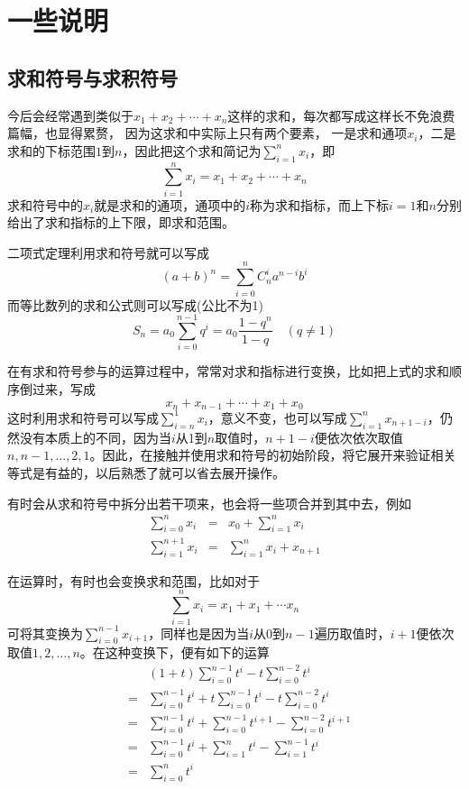 
\section{一些说明}
\label{sec:some-instruction}

\subsection{求和符号与求积符号}
\label{sec:sum-prod-symbol}

今后会经常遇到类似于$x_1+x_2+\cdots+x_n$这样的求和，每次都写成这样长不免浪费篇幅，也显得累赘， 因为这求和中实际上只有两个要素，
一是求和通项$x_i$，二是求和的下标范围$1$到$n$，因此把这个求和简记为$\sum\limits_{i=1}^nx_i$，即
\[ \sum_{i=1}^n x_i = x_1+x_2+\cdots+x_n \]
求和符号中的$x_i$就是求和的通项，通项中的$i$称为求和指标，而上下标$i=1$和$n$分别给出了求和指标的上下限，即求和范围。

\begin{example}
  二项式定理利用求和符号就可以写成
  \[ (a+b)^n = \sum_{i=0}^n C_n^i a^{n-i}b^i \]
  而等比数列的求和公式则可以写成(公比不为1)
  \[ S_n={a_0}\sum_{i=0}^{n-1}q^i = {a_0}\frac{1-q^n}{1-q} \quad (q \neq 1)\]
\end{example}

在有求和符号参与的运算过程中，常常对求和指标进行变换，比如把上式的求和顺序倒过来，写成
\[ x_n+x_{n-1}+\cdots+x_1+x_0 \]
这时利用求和符号可以写成$\sum\limits_{i=n}^1x_i$，意义不变，也可以写成$\sum\limits_{i=1}^nx_{n+1-i}$，仍然没有本质上的不同，因为当$i$从1到$n$取值时，$n+1-i$便依次依次取值$n,n-1,\ldots,2,1$。因此，在接触并使用求和符号的初始阶段，将它展开来验证相关等式是有益的，以后熟悉了就可以省去展开操作。

有时会从求和符号中拆分出若干项来，也会将一些项合并到其中去，例如
\begin{eqnarray*}
  \sum_{i=0}^nx_i & = & x_0 + \sum_{i=1}^n x_i \\
  \sum_{i=1}^{n+1}x_i & = & \sum_{i=1}^n x_i + x_{n+1}
\end{eqnarray*}

在运算时，有时也会变换求和范围，比如对于
\[ \sum_{i=1}^{n} x_i = x_1 + x_1 + \cdots x_n \]
可将其变换为$\sum\limits_{i=0}^{n-1}x_{i+1}$，同样也是因为当$i$从$0$到$n-1$遍历取值时，$i+1$便依次取值$1,2,\ldots,n$。在这种变换下，便有如下的运算
\begin{eqnarray*}
  & & (1+t)\sum_{i=0}^{n-1}t^i - t \sum_{i=0}^{n-2}t^i \\
  & = & \sum_{i=0}^{n-1}t^i + t\sum_{i=0}^{n-1}t^i - t\sum_{i=0}^{n-2}t^i \\
  & = & \sum_{i=0}^{n-1}t^i + \sum_{i=0}^{n-1}t^{i+1} -\sum_{i=0}^{n-2}t^{i+1} \\
  & = & \sum_{i=0}^{n-1}t^i + \sum_{i=1}^{n}t^i - \sum_{i=1}^{n-1}t^i \\
  & = & \sum_{i=0}^{n}t^i
\end{eqnarray*}


